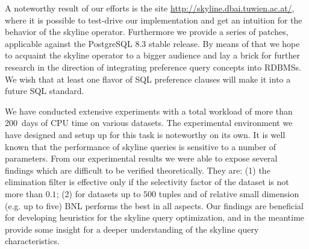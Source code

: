 A noteworthy result of our efforts is the site
\url{http://skyline.dbai.tuwien.ac.at/}, where it is possible to
test-drive our implementation and get an intuition for the behavior of
the skyline operator.  Furthermore we provide a series of patches,
applicable against the PostgreSQL 8.3 stable release. By means of that
we hope to acquaint the skyline operator to a bigger audience and
lay a brick for further research in the direction of integrating
preference query concepts into RDBMSs.  We wish that at least one
flavor of SQL preference clauses will make it into a future SQL
standard.

We have conducted extensive experiments with a total workload of 
more than 200~days of CPU time on various datasets.
The experimental environment we have designed and setup up for this
task is noteworthy on its own.
%
It is well known that the performance of skyline queries is sensitive
to a number of parameters.
%
From our experimental results we were able to expose several findings
which are difficult to be verified theoretically.  They are: (1) the
elimination filter is effective only if the selectivity factor of the
dataset is not more than $0.1$; (2) for datasets up to $500$ tuples
and of relative small dimension (e.g. up to five) BNL performs the
best in all aspects.
%
Our findings are beneficial for developing heuristics for the skyline
query optimization, and in the meantime provide some insight for a
deeper understanding of the skyline query characteristics.



% 
% 
% 
% 
% 
% 
% 
% 
% 
% 
% 

